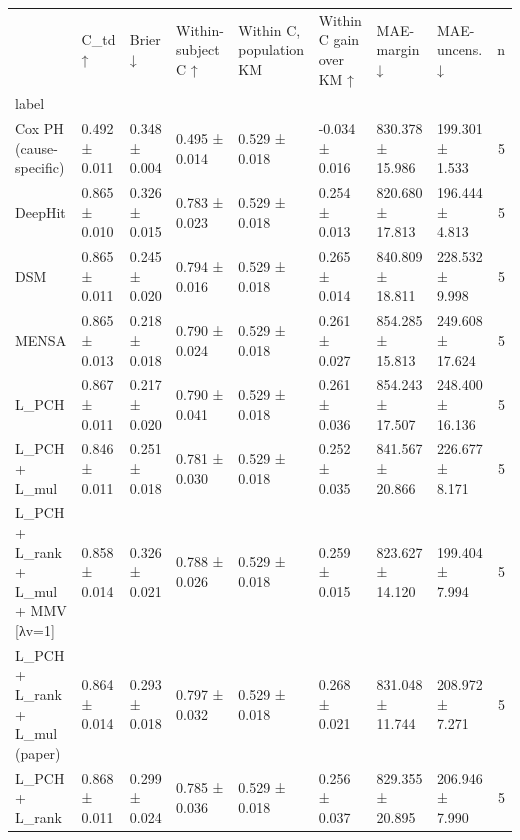 \begin{tabular}{llllllllr}
\toprule
 & C\_td ↑ & Brier ↓ & Within-subject C ↑ & Within C, population KM & Within C gain over KM ↑ & MAE-margin ↓ & MAE-uncens. ↓ & n \\
label &  &  &  &  &  &  &  &  \\
\midrule
Cox PH (cause-specific) & 0.492 ± 0.011 & 0.348 ± 0.004 & 0.495 ± 0.014 & 0.529 ± 0.018 & -0.034 ± 0.016 & 830.378 ± 15.986 & 199.301 ± 1.533 & 5 \\
DeepHit & 0.865 ± 0.010 & 0.326 ± 0.015 & 0.783 ± 0.023 & 0.529 ± 0.018 & 0.254 ± 0.013 & 820.680 ± 17.813 & 196.444 ± 4.813 & 5 \\
DSM & 0.865 ± 0.011 & 0.245 ± 0.020 & 0.794 ± 0.016 & 0.529 ± 0.018 & 0.265 ± 0.014 & 840.809 ± 18.811 & 228.532 ± 9.998 & 5 \\
MENSA & 0.865 ± 0.013 & 0.218 ± 0.018 & 0.790 ± 0.024 & 0.529 ± 0.018 & 0.261 ± 0.027 & 854.285 ± 15.813 & 249.608 ± 17.624 & 5 \\
L\_PCH & 0.867 ± 0.011 & 0.217 ± 0.020 & 0.790 ± 0.041 & 0.529 ± 0.018 & 0.261 ± 0.036 & 854.243 ± 17.507 & 248.400 ± 16.136 & 5 \\
L\_PCH + L\_mul & 0.846 ± 0.011 & 0.251 ± 0.018 & 0.781 ± 0.030 & 0.529 ± 0.018 & 0.252 ± 0.035 & 841.567 ± 20.866 & 226.677 ± 8.171 & 5 \\
L\_PCH + L\_rank + L\_mul + MMV [λv=1] & 0.858 ± 0.014 & 0.326 ± 0.021 & 0.788 ± 0.026 & 0.529 ± 0.018 & 0.259 ± 0.015 & 823.627 ± 14.120 & 199.404 ± 7.994 & 5 \\
L\_PCH + L\_rank + L\_mul (paper) & 0.864 ± 0.014 & 0.293 ± 0.018 & 0.797 ± 0.032 & 0.529 ± 0.018 & 0.268 ± 0.021 & 831.048 ± 11.744 & 208.972 ± 7.271 & 5 \\
L\_PCH + L\_rank & 0.868 ± 0.011 & 0.299 ± 0.024 & 0.785 ± 0.036 & 0.529 ± 0.018 & 0.256 ± 0.037 & 829.355 ± 20.895 & 206.946 ± 7.990 & 5 \\
\bottomrule
\end{tabular}
